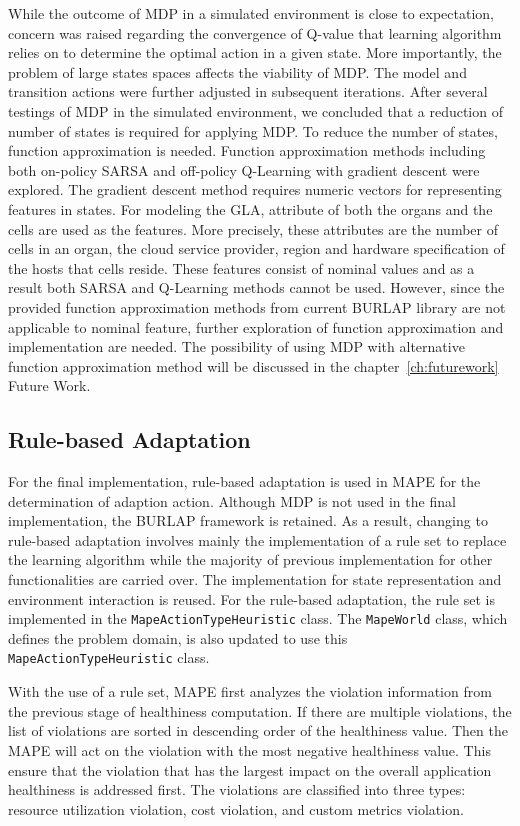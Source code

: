 \documentclass{seal_thesis}
\begin{document}
While the outcome of MDP in a simulated environment is close to expectation, concern was raised regarding the convergence of Q-value that learning algorithm relies on to determine the optimal action in a given state.
More importantly, the problem of large states spaces affects the viability of MDP.
The model and transition actions were further adjusted in subsequent iterations.
After several testings of MDP in the simulated environment, we concluded that a reduction of number of states is required for applying MDP.
To reduce the number of states, function approximation is needed.
Function approximation methods including both on-policy SARSA and off-policy Q-Learning with gradient descent were explored.
The gradient descent method requires numeric vectors for representing features in states.
For modeling the GLA, attribute of both the organs and the cells are used as the features.
More precisely, these attributes are the number of cells in an organ, the cloud service provider, region and hardware specification of the hosts that cells reside.
These features consist of nominal values and as a result both SARSA and Q-Learning methods cannot be used.
However, since the provided function approximation methods from current BURLAP library are not applicable to nominal feature, further exploration of function approximation and implementation are needed.
The possibility of using MDP with alternative function approximation method will be discussed in the chapter~\ref{ch:futurework} Future Work.

\subsection{Rule-based Adaptation} \label{RBAdaptationLogic}
For the final implementation, rule-based adaptation is used in MAPE for the determination of adaption action. 
Although MDP is not used in the final implementation, the BURLAP framework is retained.
As a result, changing to rule-based adaptation involves mainly the implementation of a rule set to replace the learning algorithm while the majority of previous implementation for other functionalities are carried over.
The implementation for state representation and environment interaction is reused.
For the rule-based adaptation, the rule set is implemented in the \texttt{MapeActionTypeHeuristic} class.
The \texttt{MapeWorld} class, which defines the problem domain, is also updated to use this \texttt{MapeActionTypeHeuristic} class.

With the use of a rule set, MAPE first analyzes the violation information from the previous stage of healthiness computation.
If there are multiple violations, the list of violations are sorted in descending order of the healthiness value.
Then the MAPE will act on the violation with the most negative healthiness value.
This ensure that the violation that has the largest impact on the overall application healthiness is addressed first.
The violations are classified into three types: resource utilization violation, cost violation, and custom metrics violation.
\end{document}
